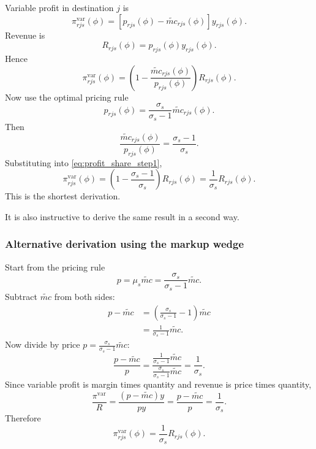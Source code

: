 \documentclass[11pt]{article}
\begin{document}
Variable profit in destination \(j\) is
\begin{equation}
\pi^{\mathrm{var}}_{rjs}(\phi)=\left[p_{rjs}(\phi)-\widetilde{mc}_{rjs}(\phi)\right]y_{rjs}(\phi).
\end{equation}
Revenue is
\begin{equation}
R_{rjs}(\phi)=p_{rjs}(\phi)y_{rjs}(\phi).
\end{equation}
Hence
\begin{equation}
\pi^{\mathrm{var}}_{rjs}(\phi)=\left(1-\frac{\widetilde{mc}_{rjs}(\phi)}{p_{rjs}(\phi)}\right)R_{rjs}(\phi).
\label{eq:profit_share_step1}
\end{equation}
Now use the optimal pricing rule
\begin{equation}
p_{rjs}(\phi)=\frac{\sigma_s}{\sigma_s-1}\widetilde{mc}_{rjs}(\phi).
\end{equation}
Then
\begin{equation}
\frac{\widetilde{mc}_{rjs}(\phi)}{p_{rjs}(\phi)} = \frac{\sigma_s-1}{\sigma_s}.
\end{equation}
Substituting into \eqref{eq:profit_share_step1},
\begin{equation}
\pi^{\mathrm{var}}_{rjs}(\phi)=\left(1-\frac{\sigma_s-1}{\sigma_s}\right)R_{rjs}(\phi)=\frac{1}{\sigma_s}R_{rjs}(\phi).
\label{eq:varprofit_share_final}
\end{equation}
This is the shortest derivation.

It is also instructive to derive the same result in a second way.

\subsubsection*{Alternative derivation using the markup wedge}

Start from the pricing rule
\begin{equation}
p=\mu_s\widetilde{mc}=\frac{\sigma_s}{\sigma_s-1}\widetilde{mc}.
\end{equation}
Subtract \(\widetilde{mc}\) from both sides:
\begin{align}
p-\widetilde{mc}
&=\left(\frac{\sigma_s}{\sigma_s-1}-1\right)\widetilde{mc}\\
&=\frac{1}{\sigma_s-1}\widetilde{mc}.
\end{align}
Now divide by price \(p=\frac{\sigma_s}{\sigma_s-1}\widetilde{mc}\):
\begin{equation}
\frac{p-\widetilde{mc}}{p}=\frac{\frac{1}{\sigma_s-1}\widetilde{mc}}{\frac{\sigma_s}{\sigma_s-1}\widetilde{mc}}=\frac{1}{\sigma_s}.
\end{equation}
Since variable profit is margin times quantity and revenue is price times quantity,
\begin{equation}
\frac{\pi^{\mathrm{var}}}{R}=\frac{(p-\widetilde{mc})y}{py}=\frac{p-\widetilde{mc}}{p}=\frac{1}{\sigma_s}.
\end{equation}
Therefore
\begin{equation}
\pi^{\mathrm{var}}_{rjs}(\phi)=\frac{1}{\sigma_s}R_{rjs}(\phi).
\end{equation}
\end{document}
